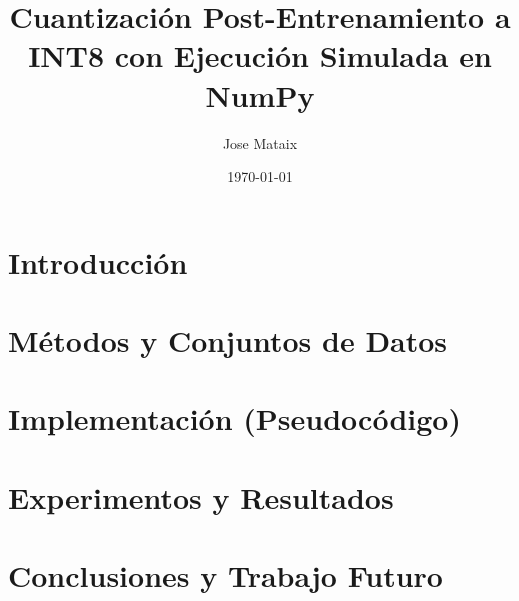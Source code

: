 \documentclass[11pt,a4paper]{article}
\title{Cuantización Post-Entrenamiento a INT8 con Ejecución Simulada en NumPy}
\author{Jose Mataix}
\date{\today}
\begin{document}
\maketitle

\begin{abstract}

\end{abstract}

\tableofcontents
\listoffigures
\listoftables

\section{Introducción}


\section{Métodos y Conjuntos de Datos}


\section{Implementación (Pseudocódigo)}


\section{Experimentos y Resultados}


\section{Conclusiones y Trabajo Futuro}


\printbibliography[title={Referencias}]
\end{document}
